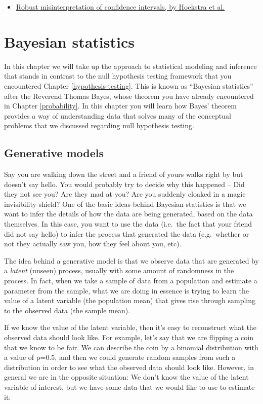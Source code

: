 \documentclass[]{book}
\providecommand{\tightlist}{%
  \setlength{\itemsep}{0pt}\setlength{\parskip}{0pt}}
\theoremstyle{definition}
\theoremstyle{definition}
\theoremstyle{definition}
\theoremstyle{remark}
\begin{document}
\begin{itemize}
\tightlist
\item
  \href{http://www.ejwagenmakers.com/inpress/HoekstraEtAlPBR.pdf}{Robust
  misinterpretation of confidence intervals, by Hoekstra et al.}
\end{itemize}

\chapter{Bayesian statistics}\label{bayesian-statistics}

In this chapter we will take up the approach to statistical modeling and
inference that stands in contrast to the null hypothesis testing
framework that you encountered Chapter \ref{hypothesis-testing}. This is
known as ``Bayesian statistics'' after the Reverend Thomas Bayes, whose
theorem you have already encountered in Chapter \ref{probability}. In
this chapter you will learn how Bayes' theorem provides a way of
understanding data that solves many of the conceptual problems that we
discussed regarding null hypothesis testing.

\section{Generative models}\label{generative-models}

Say you are walking down the street and a friend of yours walks right by
but doesn't say hello. You would probably try to decide why this
happened -- Did they not see you? Are they mad at you? Are you suddenly
cloaked in a magic invisibility shield? One of the basic ideas behind
Bayesian statistics is that we want to infer the details of how the data
are being generated, based on the data themselves. In this case, you
want to use the data (i.e.~the fact that your friend did not say hello)
to infer the process that generated the data (e.g.~whether or not they
actually saw you, how they feel about you, etc).

The idea behind a generative model is that we observe data that are
generated by a \emph{latent} (unseen) process, usually with some amount
of randomness in the process. In fact, when we take a sample of data
from a population and estimate a parameter from the sample, what we are
doing in essence is trying to learn the value of a latent variable (the
population mean) that gives rise through sampling to the observed data
(the sample mean).

If we know the value of the latent variable, then it's easy to
reconstruct what the observed data should look like. For example, let's
say that we are flipping a coin that we know to be fair. We can describe
the coin by a binomial distribution with a value of p=0.5, and then we
could generate random samples from such a distribution in order to see
what the observed data should look like. However, in general we are in
the opposite situation: We don't know the value of the latent variable
of interest, but we have some data that we would like to use to estimate
it.
\end{document}

